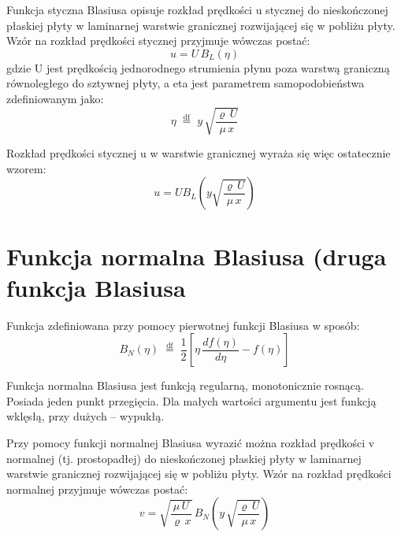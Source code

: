 \documentclass{article}
\begin{document}
Funkcja styczna Blasiusa opisuje rozkład prędkości u stycznej do nieskończonej płaskiej płyty w laminarnej warstwie granicznej rozwijającej się w pobliżu płyty. Wzór na rozkład prędkości stycznej przyjmuje wówczas postać: 
\begin{displaymath}
u=U\,B_{L}^{}(\eta )
\end{displaymath}
gdzie U jest prędkością jednorodnego strumienia płynu poza warstwą graniczną równoległego do sztywnej płyty, a eta jest parametrem samopodobieństwa zdefiniowanym jako: 
$$ \eta \;{\stackrel {\mathrm {df} }{=}}\;y\,{\sqrt {\frac {\varrho \,U}{\mu \,x}}} $$

Rozkład prędkości stycznej u w warstwie granicznej wyraża się więc ostatecznie wzorem: 
$$ u=UB_{L}\left(y{\sqrt {\frac {\varrho \,U}{\mu \,x}}}\right) $$

\section*{Funkcja normalna Blasiusa (druga funkcja Blasiusa}
Funkcja zdefiniowana przy pomocy pierwotnej funkcji Blasiusa w sposób: 
\begin{equation*}
B_{N}(\eta )\;{\stackrel {\mathrm {df} }{=}}\;{\frac {1}{2}}\left[\eta \,{\frac {df(\eta )}{d\eta }}-f(\eta )\right]
\end{equation*}

Funkcja normalna Blasiusa jest funkcją regularną, monotonicznie rosnącą. Posiada jeden punkt przegięcia. Dla małych wartości argumentu jest funkcją wklęsłą, przy dużych – wypukłą.

Przy pomocy funkcji normalnej Blasiusa wyrazić można rozkład prędkości v normalnej (tj. prostopadłej) do nieskończonej płaskiej płyty w laminarnej warstwie granicznej rozwijającej się w pobliżu płyty. Wzór na rozkład prędkości normalnej przyjmuje wówczas postać: 
\begin{equation*}
v={\sqrt {\frac {\mu \,U}{\varrho \,x}}}\,B_{N}^{}\left(y\,{\sqrt {\frac {\varrho \,U}{\mu \,x}}}\right)
\end{equation*}
\end{document}
